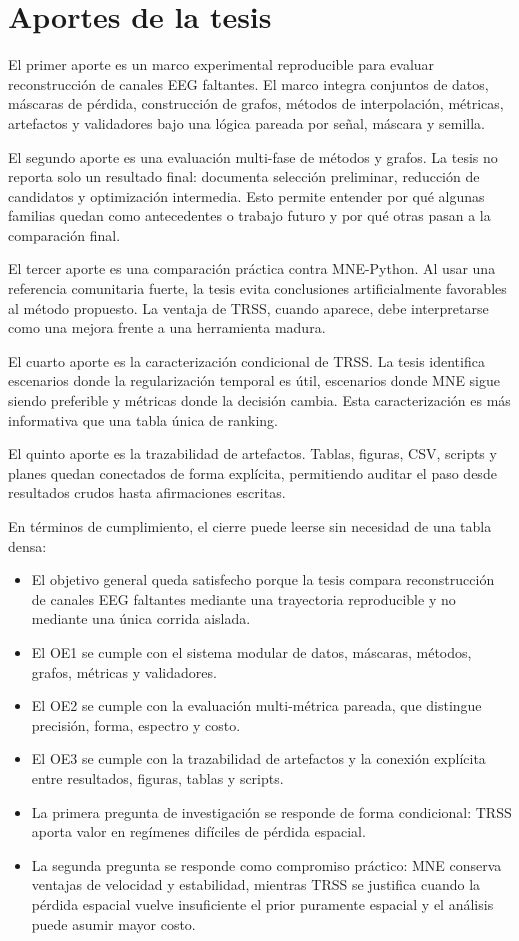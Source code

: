 \section{Aportes de la tesis}

El primer aporte es un marco experimental reproducible para evaluar reconstrucción de canales EEG faltantes. El marco integra conjuntos de datos, máscaras de pérdida, construcción de grafos, métodos de interpolación, métricas, artefactos y validadores bajo una lógica pareada por señal, máscara y semilla.

El segundo aporte es una evaluación multi-fase de métodos y grafos. La tesis no reporta solo un resultado final: documenta selección preliminar, reducción de candidatos y optimización intermedia. Esto permite entender por qué algunas familias quedan como antecedentes o trabajo futuro y por qué otras pasan a la comparación final.

El tercer aporte es una comparación práctica contra MNE-Python. Al usar una referencia comunitaria fuerte, la tesis evita conclusiones artificialmente favorables al método propuesto. La ventaja de TRSS, cuando aparece, debe interpretarse como una mejora frente a una herramienta madura.

El cuarto aporte es la caracterización condicional de TRSS. La tesis identifica escenarios donde la regularización temporal es útil, escenarios donde MNE sigue siendo preferible y métricas donde la decisión cambia. Esta caracterización es más informativa que una tabla única de ranking.

El quinto aporte es la trazabilidad de artefactos. Tablas, figuras, CSV, scripts y planes quedan conectados de forma explícita, permitiendo auditar el paso desde resultados crudos hasta afirmaciones escritas.

En términos de cumplimiento, el cierre puede leerse sin necesidad de una tabla densa:
\begin{itemize}[leftmargin=*,itemsep=2pt,topsep=3pt]
\item El objetivo general queda satisfecho porque la tesis compara reconstrucción de canales EEG faltantes mediante una trayectoria reproducible y no mediante una única corrida aislada.
\item El OE1 se cumple con el sistema modular de datos, máscaras, métodos, grafos, métricas y validadores.
\item El OE2 se cumple con la evaluación multi-métrica pareada, que distingue precisión, forma, espectro y costo.
\item El OE3 se cumple con la trazabilidad de artefactos y la conexión explícita entre resultados, figuras, tablas y scripts.
\item La primera pregunta de investigación se responde de forma condicional: TRSS aporta valor en regímenes difíciles de pérdida espacial.
\item La segunda pregunta se responde como compromiso práctico: MNE conserva ventajas de velocidad y estabilidad, mientras TRSS se justifica cuando la pérdida espacial vuelve insuficiente el prior puramente espacial y el análisis puede asumir mayor costo.
\end{itemize}

